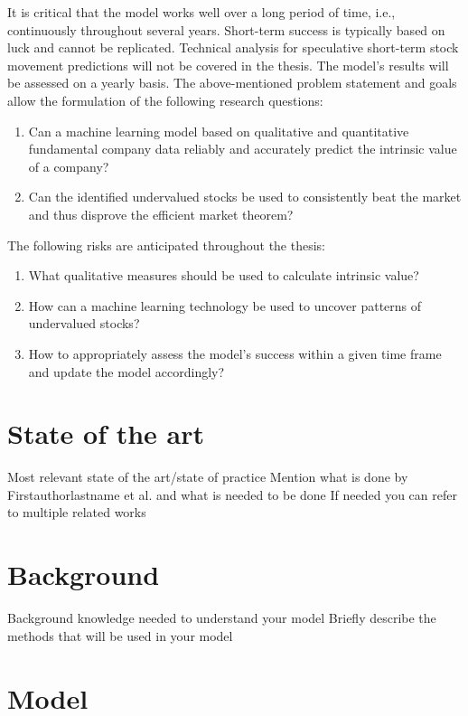 \documentclass{imc-inf}
\begin{document}
It is critical that the model works well over a long period of time, i.e., continuously throughout several years. Short-term success is typically based on luck and cannot be replicated. Technical analysis for speculative short-term stock movement predictions will not be covered in the thesis. The model's results will be assessed on a yearly basis.
The above-mentioned problem statement and goals allow the formulation of the following research questions:

\begin{enumerate}
	\item Can a machine learning model based on qualitative and quantitative fundamental company data reliably and accurately predict the intrinsic value of a company?
	\item Can the identified undervalued stocks be used to consistently beat the market and thus disprove the efficient market theorem?
\end{enumerate}

The following risks are anticipated throughout the thesis:

\begin{enumerate}
	\item What qualitative measures should be used to calculate intrinsic value?
	\item How can a machine learning technology be used to uncover patterns of undervalued stocks?
	\item How to appropriately assess the model's success within a given time frame and update the model accordingly?
\end{enumerate}



\section{State of the art}
Most relevant state of the art/state of practice
Mention what is done by Firstauthorlastname et al. and what is needed to be done
If needed you can refer to multiple related works

\section{Background}
Background knowledge needed to understand your model
Briefly describe the methods that will be used in your model

\section{Model}
\end{document}
